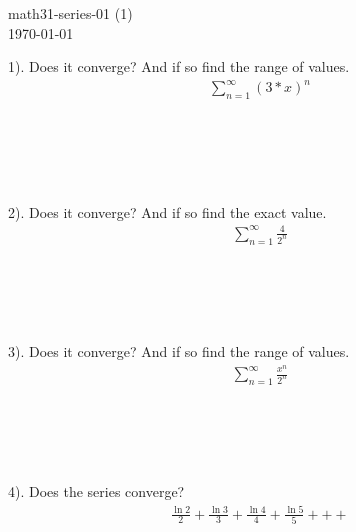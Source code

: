\documentclass[fleqn]{article}
\begin{document}
\begin{flushleft}
math31-series-01 (1)\\
\today
\end{flushleft}


1).  Does it converge?  And if so find the range of values.\\

\begin{align*}
\sum_{n=1}^{\infty} \left(3*x\right)^n\\
\end{align*}


\begin{verbatim}





\end{verbatim}

2).  Does it converge?  And if so find the exact value.\\

\begin{align*}
\sum_{n=1}^{\infty} \frac{4}{2^n}
\end{align*}


\begin{verbatim}





\end{verbatim}

3).  Does it converge?  And if so find the range of values.\\

\begin{align*}
\sum_{n=1}^{\infty} \frac{x^n}{2^n}
\end{align*}


\begin{verbatim}





\end{verbatim}

4).  Does the series converge?\\

\begin{align*}
\frac{\ln2}{2} + \frac{\ln3}{3} + \frac{\ln4}{4} + \frac{\ln5}{5} + + +\\
\end{align*}

\begin{verbatim}





\end{verbatim}
\end{document}
